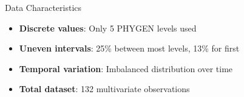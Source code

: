 \documentclass[aspectratio=43]{beamer}
\begin{document}
\begin{frame}
\begin{columns}
        \begin{column}{0.4\textwidth}
            \begin{alertblock}{Data Characteristics}
                \scriptsize
                \begin{itemize}
                    \item \textbf{Discrete values}: Only 5 PHYGEN levels used
                    \item \textbf{Uneven intervals}: 25\% between most levels, 13\% for first
                    \item \textbf{Temporal variation}: Imbalanced distribution over time
                    \item \textbf{Total dataset}: 132 multivariate observations
                \end{itemize}
            \end{alertblock}
        \end{column}
    \end{columns}
\end{frame}
\end{document}
